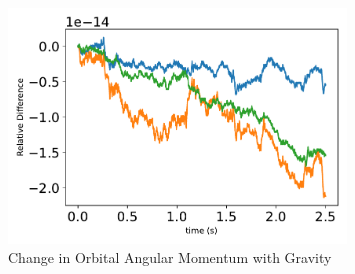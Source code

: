\begin{figure}[htbp]\centerline{\includegraphics[width=0.8\textwidth]{AutoTeX/ChangeInOrbitalAngularMomentumGravity}}\caption{Change in Orbital Angular Momentum with Gravity}\label{fig:ChangeInOrbitalAngularMomentumGravity}\end{figure}
